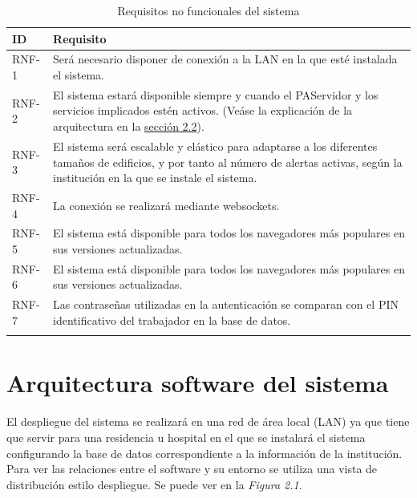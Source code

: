 \begin{longtable}{|p{}|p{}|}
	\hline
	\textbf{ID} & \textbf{Requisito} \\
	\hline
	RNF-1 	& 	Será necesario disponer de conexión a la LAN en la que esté instalada el sistema. \\
	\hline
	RNF-2	&	El sistema estará disponible siempre y cuando el PAServidor y los servicios implicados estén activos. (Veáse la explicación de la arquitectura en la \hyperref[section-arquitectura]{sección 2.2}).	\\
	\hline
	RNF-3	&	El sistema será escalable y elástico para adaptarse a los diferentes tamaños de edificios, y por tanto al número de alertas activas, según la institución en la que se instale el sistema.\\
	\hline
	RNF-4	&	La conexión se realizará mediante websockets.\\
	\hline
	RNF-5	&	El sistema está disponible para todos los navegadores más populares en sus versiones actualizadas.\\
	\hline
	RNF-6	&	El sistema está disponible para todos los navegadores más populares en sus versiones actualizadas.\\
	\hline
	RNF-7	&	Las contraseñas utilizadas en la autenticación se comparan con el PIN identificativo del trabajador en la base de datos. \\
	\hline
\caption{Requisitos no funcionales del sistema}
\label{tab:RNF}
\end{longtable}

\section{Arquitectura software del sistema}
\label{section-arquitectura}

El despliegue del sistema se realizará en una red de área local (LAN) ya que tiene que servir para una residencia u hospital en el que se instalará el sistema configurando la base de datos correspondiente a la información de la institución.\\

Para ver las relaciones entre el software y su entorno se utiliza una vista de distribución estilo despliegue. Se puede ver en la \textit{Figura 2.1}. \\

